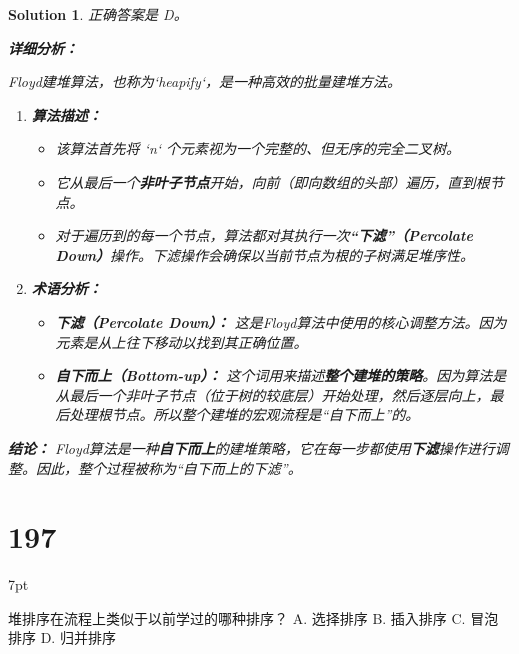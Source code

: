 \documentclass[UTF8]{report}
\newtheorem{solution}{Solution}
\theoremstyle{MyLineTheoremStyle} %
\theoremstyle{MyBlockTheoremStyle} %
\theoremstyle{MySubsubsectionStyle} %
\newenvironment{graybox}{%
        \def\FrameCommand{%
        \hspace{1pt}%
        {\color{gray}\small \vrule width 2pt}%
        {\color{graybox_color}\vrule width 4pt}%
        \colorbox{graybox_color}%
        }%
        \MakeFramed{\advance\hsize-\width\FrameRestore}%
        \noindent\hspace{-4.55pt}%
        \begin{adjustwidth}{}{7pt}%
        \vspace{2pt}\vspace{2pt}%
        }
        {%
        \vspace{2pt}\end{adjustwidth}\endMakeFramed%
        }
\begin{document}
\begin{solution}
正确答案是 D。

\textbf{详细分析：}

Floyd建堆算法，也称为`heapify`，是一种高效的批量建堆方法。

\begin{enumerate}
    \item \textbf{算法描述：}
    \begin{itemize}
        \item 该算法首先将 `n` 个元素视为一个完整的、但无序的完全二叉树。
        \item 它从最后一个\textbf{非叶子节点}开始，向前（即向数组的头部）遍历，直到根节点。
        \item 对于遍历到的每一个节点，算法都对其执行一次\textbf{“下滤”（Percolate Down）}操作。下滤操作会确保以当前节点为根的子树满足堆序性。
    \end{itemize}

    \item \textbf{术语分析：}
    \begin{itemize}
        \item \textbf{下滤（Percolate Down）：} 这是Floyd算法中使用的核心调整方法。因为元素是从上往下移动以找到其正确位置。
        \item \textbf{自下而上（Bottom-up）：} 这个词用来描述\textbf{整个建堆的策略}。因为算法是从最后一个非叶子节点（位于树的较底层）开始处理，然后逐层向上，最后处理根节点。所以整个建堆的宏观流程是“自下而上”的。
    \end{itemize}
\end{enumerate}

\textbf{结论：}
Floyd算法是一种\textbf{自下而上}的建堆策略，它在每一步都使用\textbf{下滤}操作进行调整。因此，整个过程被称为“自下而上的下滤”。
\end{solution}


\section*{197}
\begin{graybox}
堆排序在流程上类似于以前学过的哪种排序？
A. 选择排序
B. 插入排序
C. 冒泡排序
D. 归并排序
\end{graybox}
\end{document}
